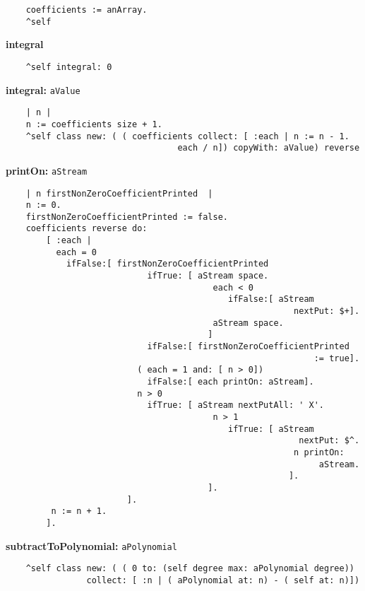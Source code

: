 \begin{verbatim}
    coefficients := anArray.
    ^self

\end{verbatim}
{\bf integral}
\begin{verbatim}
    ^self integral: 0

\end{verbatim}
{\bf integral:} {\tt aValue}
\begin{verbatim}
    | n |
    n := coefficients size + 1.
    ^self class new: ( ( coefficients collect: [ :each | n := n - 1. 
                                  each / n]) copyWith: aValue) reverse

\end{verbatim}
{\bf printOn:} {\tt aStream}
\begin{verbatim}
    | n firstNonZeroCoefficientPrinted  |
    n := 0.
    firstNonZeroCoefficientPrinted := false.
    coefficients reverse do:
        [ :each |
          each = 0
            ifFalse:[ firstNonZeroCoefficientPrinted
                            ifTrue: [ aStream space.
                                         each < 0
                                            ifFalse:[ aStream 
                                                         nextPut: $+].
                                         aStream space.
                                        ]
                            ifFalse:[ firstNonZeroCoefficientPrinted 
                                                             := true].
                          ( each = 1 and: [ n > 0])
                            ifFalse:[ each printOn: aStream].
                          n > 0
                            ifTrue: [ aStream nextPutAll: ' X'.
                                         n > 1
                                            ifTrue: [ aStream 
                                                          nextPut: $^.
                                                         n printOn: 
                                                              aStream.
                                                        ].
                                        ].
                        ].
         n := n + 1.
        ].

\end{verbatim}
{\bf subtractToPolynomial:} {\tt aPolynomial}
\begin{verbatim}
    ^self class new: ( ( 0 to: (self degree max: aPolynomial degree)) 
                collect: [ :n | ( aPolynomial at: n) - ( self at: n)])

\end{verbatim}

